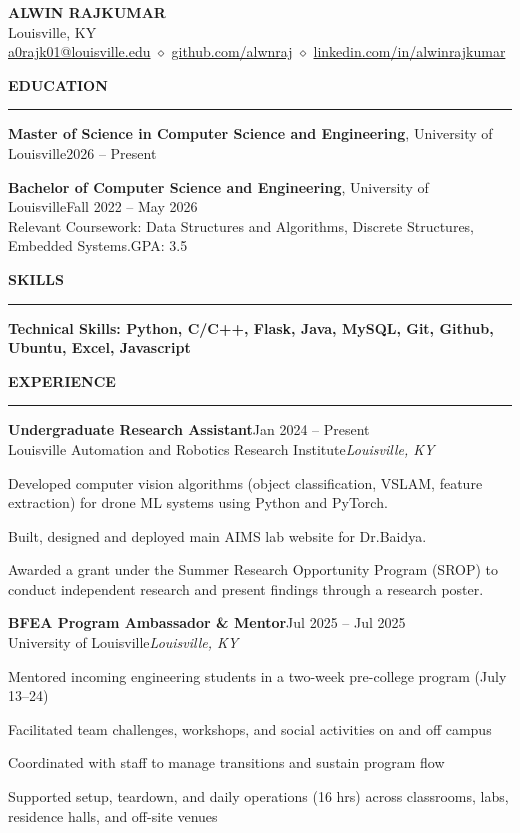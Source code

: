 \documentclass[11pt,letterpaper]{article}
\renewenvironment{itemize}{%
  \begin{list}{\textbullet}{%
    \setlength{\leftmargin}{1.5em}%
    \setlength{\topsep}{5pt}%
    \setlength{\itemsep}{3pt}%
    \setlength{\parsep}{0pt}%
    \setlength{\partopsep}{0pt}}%
}{\end{list}}
\newcommand{\resumesection}[1]{%
  \par\addvspace{10pt}%
  {\large\bfseries #1}\par\vspace{2pt}\hrule\vspace{5pt}}
\newcommand{\role}[4]{%
  \textbf{#1}\hfill #2\\%
  #3\hfill\textit{#4}\par}
\begin{document}
\begin{center}
  {\LARGE\bfseries ALWIN RAJKUMAR}\\[4pt]
  Louisville, KY\\[3pt]
  \href{mailto:a0rajk01@louisville.edu}{a0rajk01@louisville.edu}
  $\diamond$ \href{https://github.com/alwnraj}{github.com/alwnraj}
  $\diamond$ \href{https://www.linkedin.com/in/alwinrajkumar/}{linkedin.com/in/alwinrajkumar}
\end{center}
\vspace{-5pt}

\resumesection{EDUCATION}
\textbf{Master of Science in Computer Science and Engineering}, University of Louisville\hfill 2026 -- Present\par\vspace{4pt}
\textbf{Bachelor of Computer Science and Engineering}, University of Louisville\hfill Fall 2022 -- May 2026\\
Relevant Coursework: Data Structures and Algorithms, Discrete Structures, Embedded Systems.\hfill GPA: 3.5

\resumesection{SKILLS}
\textbf{Technical Skills: Python, C/C++, Flask, Java, MySQL, Git, Github, Ubuntu, Excel, Javascript}

\resumesection{EXPERIENCE}
\role{Undergraduate Research Assistant}{Jan 2024 -- Present}
  {Louisville Automation and Robotics Research Institute}{Louisville, KY}
\begin{itemize}
  \item Developed computer vision algorithms (object classification, VSLAM, feature extraction) for drone ML systems using Python and PyTorch.
  \item Built, designed and deployed main AIMS lab website for Dr.Baidya.
  \item Awarded a grant under the Summer Research Opportunity Program (SROP) to conduct independent research and present findings through a research poster.
\end{itemize}

\role{BFEA Program Ambassador \& Mentor}{Jul 2025 -- Jul 2025}
  {University of Louisville}{Louisville, KY}
\begin{itemize}
  \item Mentored incoming engineering students in a two-week pre-college program (July 13--24)
  \item Facilitated team challenges, workshops, and social activities on and off campus
  \item Coordinated with staff to manage transitions and sustain program flow
  \item Supported setup, teardown, and daily operations (16 hrs) across classrooms, labs, residence halls, and off-site venues
\end{itemize}
\end{document}
